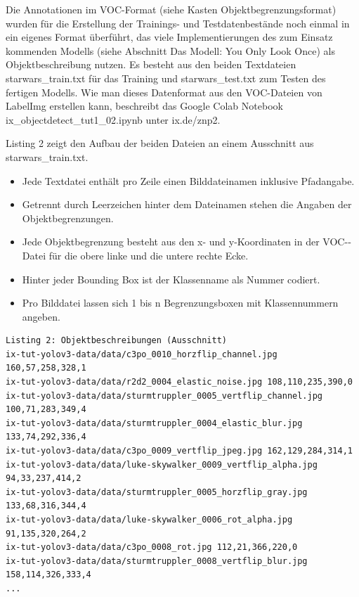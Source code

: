 


Die Annotationen im VOC-Format (siehe Kasten \glqq Objektbegrenzungsformat\grqq) 
wurden für die Erstellung der Trainings- und Testdatenbestände noch einmal in
ein eigenes Format überführt, das viele Implementierungen des zum Einsatz kommenden Modells 
(siehe Abschnitt \glqq Das Modell: You Only Look Once\grqq) als Objektbeschreibung nutzen. 
Es besteht aus den beiden Textdateien starwars\_train.txt für das Training und starwars\_test.txt 
zum Testen des fertigen Modells. Wie man dieses Datenformat aus den VOC-Dateien von LabelImg 
erstellen kann, beschreibt das Google Colab Notebook ix\_objectdetect\_tut1\_02.ipynb unter ix.de/znp2. 

Listing 2 zeigt den Aufbau der beiden Dateien an einem Ausschnitt aus starwars\_train.txt. 

\begin{itemize}
	\item Jede Textdatei enthält pro Zeile einen Bilddateinamen inklusive Pfadangabe. 
    \item Getrennt durch Leerzeichen hinter dem Dateinamen stehen die Angaben der Objektbegrenzungen. 
    \item Jede Objektbegrenzung besteht aus den x- und y-Koordinaten in der VOC-­Datei für die obere linke und die untere rechte Ecke. 
    \item Hinter jeder Bounding Box ist der Klassenname als Nummer codiert. 
    \item Pro Bilddatei lassen sich 1 bis n Begrenzungsboxen mit Klassennummern angeben. 
\end{itemize}

\begin{lstlisting}
Listing 2: Objektbeschreibungen (Ausschnitt) 
ix-tut-yolov3-data/data/c3po_0010_horzflip_channel.jpg 160,57,258,328,1
ix-tut-yolov3-data/data/r2d2_0004_elastic_noise.jpg 108,110,235,390,0
ix-tut-yolov3-data/data/sturmtruppler_0005_vertflip_channel.jpg 100,71,283,349,4
ix-tut-yolov3-data/data/sturmtruppler_0004_elastic_blur.jpg 133,74,292,336,4
ix-tut-yolov3-data/data/c3po_0009_vertflip_jpeg.jpg 162,129,284,314,1
ix-tut-yolov3-data/data/luke-skywalker_0009_vertflip_alpha.jpg 94,33,237,414,2
ix-tut-yolov3-data/data/sturmtruppler_0005_horzflip_gray.jpg 133,68,316,344,4
ix-tut-yolov3-data/data/luke-skywalker_0006_rot_alpha.jpg 91,135,320,264,2
ix-tut-yolov3-data/data/c3po_0008_rot.jpg 112,21,366,220,0
ix-tut-yolov3-data/data/sturmtruppler_0008_vertflip_blur.jpg 158,114,326,333,4
...
\end{lstlisting}

